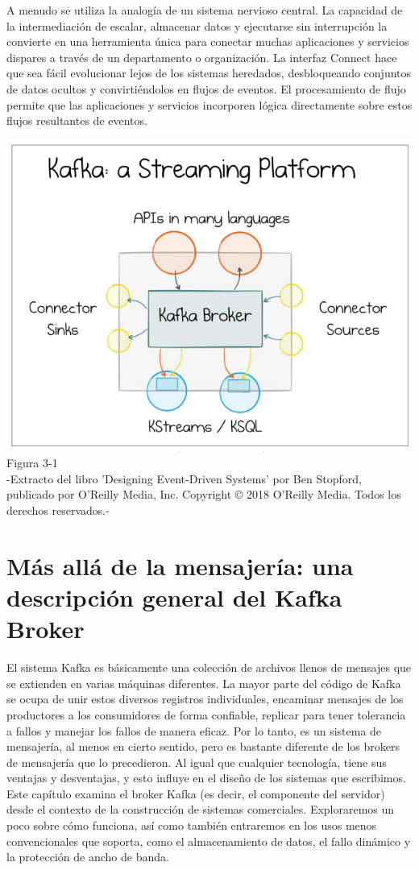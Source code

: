 \documentclass{article}
\begin{document}
A menudo se utiliza la analogía de un sistema nervioso central. La capacidad de la intermediación de escalar, almacenar datos y ejecutarse sin interrupción la convierte en una herramienta única para conectar muchas aplicaciones y servicios dispares a través de un departamento o organización. La interfaz Connect hace que sea fácil evolucionar lejos de los sistemas heredados, desbloqueando conjuntos de datos ocultos y convirtiéndolos en flujos de eventos. El procesamiento de flujo permite que las aplicaciones y servicios incorporen lógica directamente sobre estos flujos resultantes de eventos.
\begin{center}
    \includegraphics[scale=0.8]{figure3.1.png}
    Figura 3-1\\
    -Extracto del libro 'Designing Event-Driven Systems' por Ben Stopford, publicado por O'Reilly Media, Inc. Copyright © 2018 O'Reilly Media. Todos los derechos reservados.-
\end{center}

\newpage
\section{Más allá de la mensajería: una descripción general del Kafka Broker}
El sistema Kafka es básicamente una colección de archivos llenos de mensajes que se extienden en varias máquinas diferentes. La mayor parte del código de Kafka se ocupa de unir estos diversos registros individuales, encaminar mensajes de los productores a los consumidores de forma confiable, replicar para tener tolerancia a fallos y manejar los fallos de manera eficaz. Por lo tanto, es un sistema de mensajería, al menos en cierto sentido, pero es bastante diferente de los brokers de mensajería que lo precedieron. Al igual que cualquier tecnología, tiene sus ventajas y desventajas, y esto influye en el diseño de los sistemas que escribimos. Este capítulo examina el broker Kafka (es decir, el componente del servidor) desde el contexto de la construcción de sistemas comerciales. Exploraremos un poco sobre cómo funciona, así como también entraremos en los usos menos convencionales que soporta, como el almacenamiento de datos, el fallo dinámico y la protección de ancho de banda.\\
\end{document}
